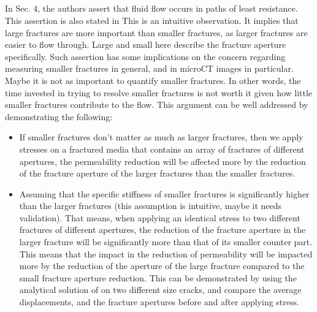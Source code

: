 \documentclass[12pt,titlepage]{article}
\begin{document}
\subsection[Zimmerman and Bodvarsson (1996)]{\cite{Zimmerman1996}}
In Sec. 4, the authors assert that fluid flow occurs in paths of least resistance. This assertion is also stated in \citep{Lubbe2006} This is an intuitive observation. It implies that large fractures are more important than smaller fractures, as larger fractures are easier to flow through. Large and small here describe the fracture aperture specifically. Such assertion has some implications on the concern regarding measuring smaller fractures in general, and in microCT images in particular. Maybe it is not as important to quantify smaller fractures. In other words, the time invested in trying to resolve smaller fractures is not worth it given how little smaller fractures contribute to the flow. This argument can be well addressed by demonstrating the following:
\begin{itemize}
\item If smaller fractures don't matter as much as larger fractures, then we apply stresses on a fractured media that contains an array of fractures of different apertures, the permeability reduction will be affected more by the reduction of the fracture aperture of the larger fractures than the smaller fractures.
\item Assuming that the specific stiffness \citep{Hopkins1987} of smaller fractures is significantly higher than the larger fractures (this assumption is intuitive, maybe it needs validation). That means, when applying an identical stress to two different fractures of different apertures, the reduction of the fracture aperture in the larger fracture will be significantly more than that of its smaller counter part. This means that the impact in the reduction of permeability will be impacted more by the reduction of the aperture of the large fracture compared to the small fracture aperture reduction. This can be demonstrated by using the analytical solution of \cite{Maugis1992} on two different size cracks, and compare the average displacements, and the fracture apertures before and after applying stress.

\end{itemize}
\end{document}
